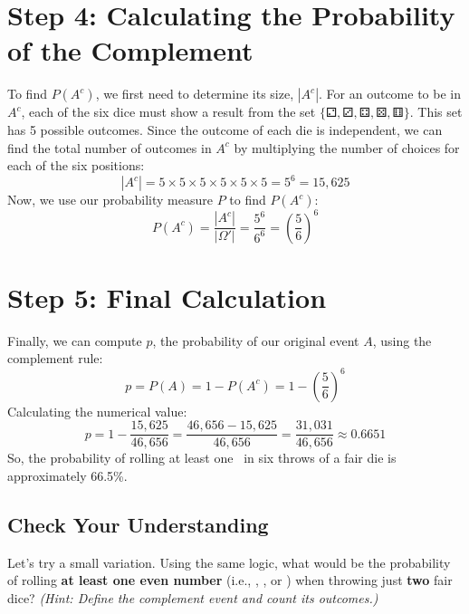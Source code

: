 \documentclass[11pt,a4paper]{article}
\begin{document}
\section{Step 4: Calculating the Probability of the Complement}

To find $P(A^c)$, we first need to determine its size, $|A^c|$. For an outcome to be in $A^c$, each of the six dice must show a result from the set $\{\diceii, \diceiii, \diceiv, \dicev, \dicevi\}$. This set has 5 possible outcomes.
Since the outcome of each die is independent, we can find the total number of outcomes in $A^c$ by multiplying the number of choices for each of the six positions:
\[
|A^c| = 5 \times 5 \times 5 \times 5 \times 5 \times 5 = 5^6 = 15,625
\]
Now, we use our probability measure $P$ to find $P(A^c)$:
\[
P(A^c) = \frac{|A^c|}{|\Omega'|} = \frac{5^6}{6^6} = \left(\frac{5}{6}\right)^6
\]

\section{Step 5: Final Calculation}

Finally, we can compute $p$, the probability of our original event $A$, using the complement rule:
\[
p = P(A) = 1 - P(A^c) = 1 - \left(\frac{5}{6}\right)^6
\]
Calculating the numerical value:
\[
p = 1 - \frac{15,625}{46,656} = \frac{46,656 - 15,625}{46,656} = \frac{31,031}{46,656} \approx 0.6651
\]
So, the probability of rolling at least one \dicei\ in six throws of a fair die is approximately 66.5\%.

\subsection*{Check Your Understanding}
Let's try a small variation. Using the same logic, what would be the probability of rolling \textbf{at least one even number} (i.e., \diceii, \diceiv, or \dicevi) when throwing just \textbf{two} fair dice?
\textit{(Hint: Define the complement event and count its outcomes.)}
\end{document}
